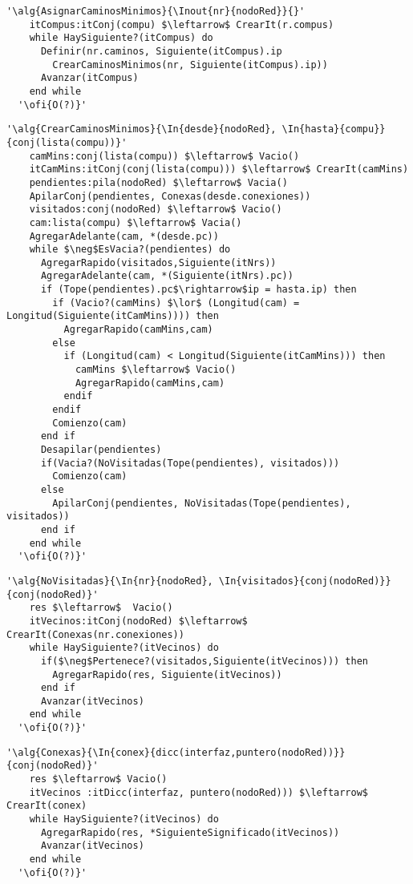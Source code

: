 \begin{lstlisting}[mathescape]
  '\alg{AsignarCaminosMinimos}{\Inout{nr}{nodoRed}}{}'
    itCompus:itConj(compu) $\leftarrow$ CrearIt(r.compus)
    while HaySiguiente?(itCompus) do                                                    
      Definir(nr.caminos, Siguiente(itCompus).ip
        CrearCaminosMinimos(nr, Siguiente(itCompus).ip))
      Avanzar(itCompus)
    end while
  '\ofi{O(?)}'
\end{lstlisting}
\newpage
\begin{lstlisting}[mathescape]
  '\alg{CrearCaminosMinimos}{\In{desde}{nodoRed}, \In{hasta}{compu}}{conj(lista(compu))}'
    camMins:conj(lista(compu)) $\leftarrow$ Vacio()
    itCamMins:itConj(conj(lista(compu))) $\leftarrow$ CrearIt(camMins)
    pendientes:pila(nodoRed) $\leftarrow$ Vacia()
    ApilarConj(pendientes, Conexas(desde.conexiones))
    visitados:conj(nodoRed) $\leftarrow$ Vacio()
    cam:lista(compu) $\leftarrow$ Vacia()
    AgregarAdelante(cam, *(desde.pc))
    while $\neg$EsVacia?(pendientes) do 
      AgregarRapido(visitados,Siguiente(itNrs))
      AgregarAdelante(cam, *(Siguiente(itNrs).pc))
      if (Tope(pendientes).pc$\rightarrow$ip = hasta.ip) then
        if (Vacio?(camMins) $\lor$ (Longitud(cam) = Longitud(Siguiente(itCamMins)))) then
          AgregarRapido(camMins,cam)
        else
          if (Longitud(cam) < Longitud(Siguiente(itCamMins))) then
            camMins $\leftarrow$ Vacio()
            AgregarRapido(camMins,cam)
          endif
        endif
        Comienzo(cam)
      end if
      Desapilar(pendientes)
      if(Vacia?(NoVisitadas(Tope(pendientes), visitados)))
        Comienzo(cam)
      else
        ApilarConj(pendientes, NoVisitadas(Tope(pendientes), visitados))
      end if
    end while 
  '\ofi{O(?)}'
\end{lstlisting}

\newpage

\begin{lstlisting}[mathescape]
  '\alg{NoVisitadas}{\In{nr}{nodoRed}, \In{visitados}{conj(nodoRed)}}{conj(nodoRed)}'
    res $\leftarrow$  Vacio()
    itVecinos:itConj(nodoRed) $\leftarrow$ CrearIt(Conexas(nr.conexiones))
    while HaySiguiente?(itVecinos) do                                                    
      if($\neg$Pertenece?(visitados,Siguiente(itVecinos))) then
        AgregarRapido(res, Siguiente(itVecinos))
      end if
      Avanzar(itVecinos)
    end while
  '\ofi{O(?)}'
\end{lstlisting}

\begin{lstlisting}[mathescape]
  '\alg{Conexas}{\In{conex}{dicc(interfaz,puntero(nodoRed))}}{conj(nodoRed)}'
    res $\leftarrow$ Vacio()
    itVecinos :itDicc(interfaz, puntero(nodoRed))) $\leftarrow$ CrearIt(conex)
    while HaySiguiente?(itVecinos) do                                                    
      AgregarRapido(res, *SiguienteSignificado(itVecinos))
      Avanzar(itVecinos)
    end while
  '\ofi{O(?)}'
\end{lstlisting}


